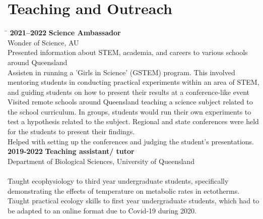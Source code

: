 \documentclass[a4paper,11pt,english]{article}
\begin{document}
\section*{Teaching and Outreach}
\begin{flushleft}
	\begin{tabbing}
		\hspace{2in}\=\kill
		\textbf{2021--2022} \> \textbf{Science Ambassador}  \\
		\> Wonder of Science, AU    \\
		\> {Presented information about STEM, academia, and careers to various schools around Queensland}   \\
		\> {Assisten in running a 'Girls in Science' (GSTEM) program. This involved mentoring students in conducting practical experiments within an area of STEM, and guiding students on how to present their results at a conference-like event}\\
		\> {Visited remote schools around Queensland teaching a science subject related to the school curriculum. In groups, students would run their own experiments to test a hypothesis related to the subject. Regional and state conferences were held for the students to present their findings.}\\
		\> {Helped with setting up the conferences and judging the student's presentations.}
	 \\  %
		\textbf{2019-2022} \> \textbf{Teaching assistant/ tutor}       \\
		\> Department of Biological Sciences, University of Queensland  \\
		  \\
		\> {Taught ecophysiology to third year undergraduate students, specifically demonstrating the effects of temperature on metabolic rates in ectotherms.}\\
		\> {Taught practical ecology skills to first year undergraduate students, which had to be adapted to an online format due to Covid-19 during 2020.}
		
	
	   \\                                         
	\end{tabbing}	
\end{flushleft}
\end{document}
